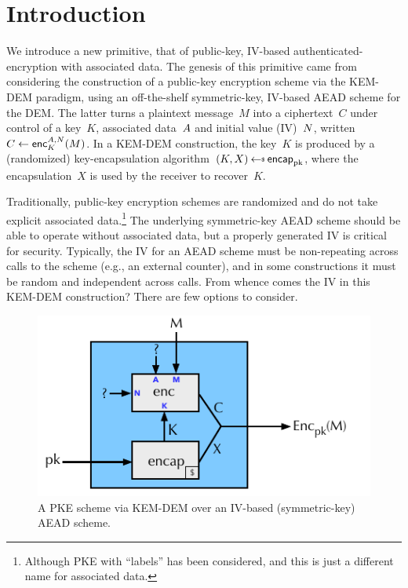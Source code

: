 \section{Introduction}
\label{sec:intro}
We introduce a new primitive, that of public-key, IV-based authenticated-encryption with associated data. The genesis of this primitive came from considering the construction of a public-key encryption scheme via the KEM-DEM paradigm, using an off-the-shelf symmetric-key, IV-based AEAD scheme for the DEM.  The latter turns a plaintext message~$M$ into a ciphertext~$C$ under control of a key~$K$, associated data~$A$ and initial value (IV)~$N$, written $C \gets {\mathsf{enc}}_{K}^{A,N}(M)$.  In a KEM-DEM construction, the key~$K$ is produced by a (randomized) key-encapsulation algorithm~$(K,X)\getsr\encap_\pk$, where the encapsulation~$X$ is used by the receiver to recover~$K$.  

Traditionally, public-key encryption schemes are randomized and do not take explicit associated data.\footnote{Although PKE with ``labels'' has been considered, and this is just a different name for associated data.} The underlying symmetric-key AEAD scheme should be able to operate without associated data, but a properly generated IV is critical for security.  Typically, the IV for an AEAD scheme must be non-repeating across calls to the scheme (e.g., an external counter), and in some constructions it must be random and independent across calls. From whence comes the IV in this KEM-DEM construction?  There are few options to consider.  

\begin{figure}[h]
\begin{center}
\includegraphics[scale=1.2]{kem-dem.pdf}
\caption{A PKE scheme via KEM-DEM over an IV-based (symmetric-key) AEAD scheme.}
\label{fig:}
\end{center}
\end{figure}

